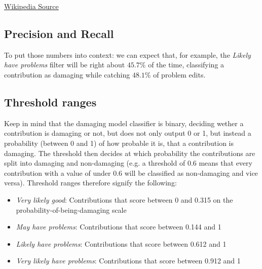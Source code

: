 \documentclass[12pt,a4paper]{article}
\begin{document}
{\href{https://en.wikipedia.org/wiki/Special:ORESModels}{Wikipedia Source}
\subsection{Precision and Recall}
To put those numbers into context: we can expect that, for example, the \textit{Likely have problems} filter will be right about $45.7\%$ of the time, classifying a contribution as damaging while catching $48.1\%$ of problem edits.\\

\subsection{Threshold ranges}
Keep in mind that the damaging model classifier is binary, deciding wether a contribution is damaging or not, but does not only output 0 or 1, but instead a probability (between 0 and 1) of how probable it is, that a contribution is damaging. The threshold then decides at which probability the contributions are split into damaging and non-damaging (e.g. a threshold of 0.6 means that every contribution with a value of under 0.6 will be classified as non-damaging and vice versa). Threshold ranges therefore signify the following: 
\begin{itemize}
\item \textit{Very likely good}: Contributions that score between 0 and 0.315 on the probability-of-being-damaging scale
\item \textit{May have problems}: Contributions that score between 0.144 and 1
\item \textit{Likely have problems}: Contributions that score between 0.612 and 1
\item \textit{Very likely have problems}: Contributions that score between 0.912 and 1
\end{itemize}

}
\end{document}
